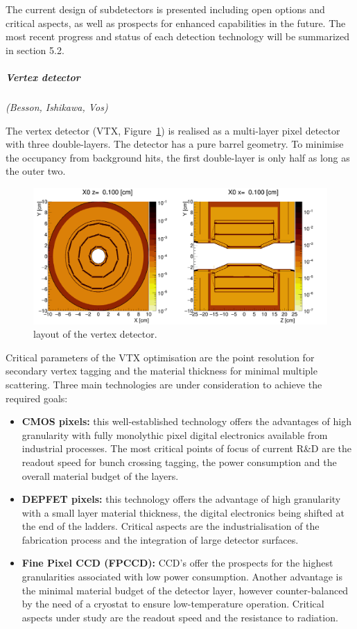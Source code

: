 The current design of subdetectors is presented including open options and critical aspects, as well as prospects for enhanced capabilities in the future. The most recent progress and status of each detection technology will be summarized in section 5.2.

\vspace{1cm}
\subparagraph*{\bf Vertex detector}
\textit{(Besson, Ishikawa, Vos)}

The vertex detector (VTX, Figure~\ref{fig:det:vertex}) is realised as a multi-layer pixel detector with three double-layers. The detector has a pure barrel geometry. To minimise the occupancy from background hits,
the first double-layer is only half as long as the outer two. 



\begin{figure}[t!]
\centering
\includegraphics[width=0.6\hsize]{Detector/fig/vertex.png}
\caption{layout of the vertex detector.}
\label{fig:det:vertex}
\end{figure}

Critical parameters of the VTX optimisation are the point resolution for secondary vertex tagging and the material thickness for minimal multiple scattering. Three main technologies are under consideration to achieve the required goals:
\begin{itemize}
    \item {\bf CMOS pixels:} this well-established technology offers the advantages of high granularity with fully monolythic pixel digital electronics available from industrial processes. The most critical points of focus of current R\&D are the readout speed for bunch crossing tagging, the power consumption and the overall material budget of the layers.
    \item {\bf DEPFET pixels:} this technology offers the advantage of high granularity with a small layer material thickness, the digital electronics being shifted at the end of the ladders. Critical aspects are the industrialisation of the fabrication process and the integration of large detector surfaces.
    \item{\bf Fine Pixel CCD (FPCCD):} CCD's offer the prospects for the highest granularities associated with low power consumption. Another advantage is the minimal material budget of the detector layer, however counter-balanced by the need of a cryostat to ensure low-temperature operation. Critical aspects under study are the readout speed and the resistance to radiation.  
\end{itemize}

